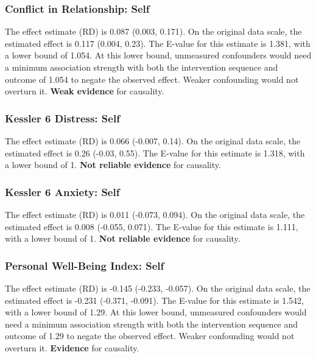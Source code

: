 \documentclass[
  singlecolumn]{article}
\begin{document}
\subsubsection{Conflict in Relationship:
Self}\label{conflict-in-relationship-self-10}

The effect estimate (RD) is 0.087 (0.003, 0.171). On the original data
scale, the estimated effect is 0.117 (0.004, 0.23). The E-value for this
estimate is 1.381, with a lower bound of 1.054. At this lower bound,
unmeasured confounders would need a minimum association strength with
both the intervention sequence and outcome of 1.054 to negate the
observed effect. Weaker confounding would not overturn it. \textbf{Weak
evidence} for causality.

\subsubsection{Kessler 6 Distress:
Self}\label{kessler-6-distress-self-10}

The effect estimate (RD) is 0.066 (-0.007, 0.14). On the original data
scale, the estimated effect is 0.26 (-0.03, 0.55). The E-value for this
estimate is 1.318, with a lower bound of 1. \textbf{Not reliable
evidence} for causality.

\subsubsection{Kessler 6 Anxiety: Self}\label{kessler-6-anxiety-self-10}

The effect estimate (RD) is 0.011 (-0.073, 0.094). On the original data
scale, the estimated effect is 0.008 (-0.055, 0.071). The E-value for
this estimate is 1.111, with a lower bound of 1. \textbf{Not reliable
evidence} for causality.

\subsubsection{Personal Well-Being Index:
Self}\label{personal-well-being-index-self-10}

The effect estimate (RD) is -0.145 (-0.233, -0.057). On the original
data scale, the estimated effect is -0.231 (-0.371, -0.091). The E-value
for this estimate is 1.542, with a lower bound of 1.29. At this lower
bound, unmeasured confounders would need a minimum association strength
with both the intervention sequence and outcome of 1.29 to negate the
observed effect. Weaker confounding would not overturn it.
\textbf{Evidence} for causality.
\end{document}

